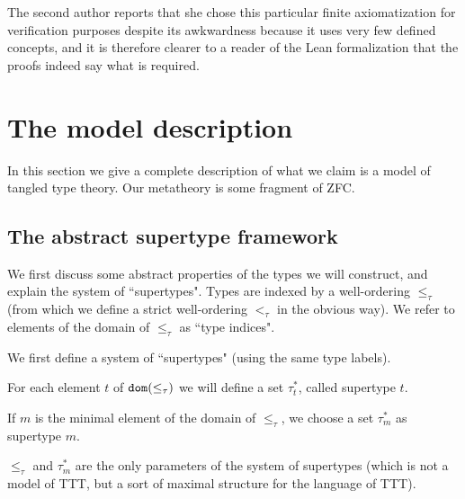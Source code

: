 \documentclass[112pt]{article}
\theoremstyle{definition}
\theoremstyle{remark}
\newcommand{\suggest}[1]{{\color{red} #1}}
\begin{document}
The second author reports that she chose this particular finite axiomatization for verification purposes despite its awkwardness because it uses very few defined concepts, and it is therefore clearer to a reader of the Lean formalization that the proofs indeed say what is required.



\newpage

\section{The model description}\label{s:model_description}


In this section we give a complete description of what we claim is a model of tangled type theory.  Our metatheory is some fragment of ZFC.

\subsection{The abstract supertype framework}
\label{ss:supertype_framework}

\begin{comment}  as annot
  I'm going to attempt a revision of the layout of sections 3 and 4.
  The content remains the same, but its presentation does not.
  Suggested additions in \suggest{red} are often made to replace the expository value of named {\tt description} items.
  I am going to systematically name each section/definition/lemma/theorem used so that we can refer to them with {\tt \textbackslash ref}; prefixes with colons describe the type of object being referred to.
\end{comment}

{We first discuss some abstract properties of the types we will construct, and explain the system of ``supertypes".}
Types are indexed by a well-ordering $\leq_\tau$ (from which we define a strict well-ordering $<_\tau$ in the obvious way).
We refer to elements of the domain of $\leq_\tau$ as ``type indices".

We first define a system of ``supertypes" (using the same type labels).

For each element $t$ of ${\tt dom}(\leq_\tau)$ we will define a set $\tau^*_t$, called supertype $t$.

If $m$ is the minimal element of the domain of $\leq_\tau$, we choose a set $\tau^*_m$ as supertype $m$.

$\leq_\tau$ and $\tau^*_m$ are the only parameters of the system of supertypes (which is not a model of TTT, but a sort of maximal structure for the language of TTT).
\end{document}
